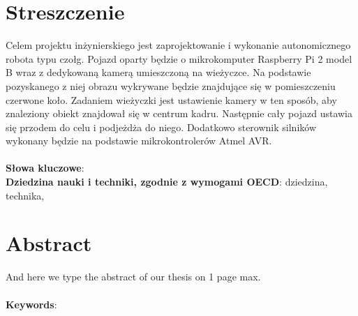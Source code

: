 
\chapter*{Streszczenie}
Celem projektu inżynierskiego jest zaprojektowanie i wykonanie autonomicznego robota typu czołg. Pojazd oparty będzie o mikrokomputer Raspberry Pi 2 model B wraz z dedykowaną kamerą umieszczoną na wieżyczce. Na podstawie pozyskanego z niej obrazu wykrywane będzie znajdujące się w  pomieszczeniu czerwone koło. Zadaniem wieżyczki jest ustawienie kamery w ten sposób, aby znaleziony obiekt znajdował się w centrum kadru. Następnie cały pojazd ustawia się przodem do celu i podjeżdża do niego. Dodatkowo sterownik silników wykonany będzie na podstawie mikrokontrolerów Atmel AVR.
\\\\
\noindent
\textbf{Słowa kluczowe}: 
\\

\noindent
\textbf{Dziedzina nauki i techniki, zgodnie z wymogami OECD}: dziedzina, technika,
\chapter*{Abstract}
And here we type the abstract of our thesis on 1 page max.
\\\\
\noindent
\textbf{Keywords}: